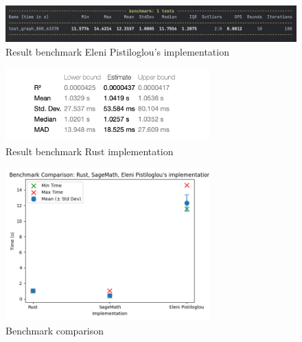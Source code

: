 \begin{figure}[!h]
    \centering
    \includegraphics[width=1\textwidth]{images/benchmark/graph_800_63378/benchmark_graph_800_63378_python}
    \caption{Result benchmark Eleni Pistiloglou's implementation}
    \label{fig:benchmark-graph-800-63378-python}
\end{figure}

\begin{figure}[!h]
    \centering
    \includegraphics[width=0.70\textwidth]{images/benchmark/graph_800_63378/benchmark_graph_800_63378_rust}
    \caption{Result benchmark Rust implementation}
    \label{fig:benchmark-graph-800-63378-rust}
\end{figure}

\begin{figure}[!h]
    \centering
    \includegraphics[width=0.70\textwidth]{images/benchmark/graph_800_63378/benchmark_comparison_graph_800_63378}
    \caption{Benchmark comparison}
    \label{fig:benchmark-comparison-graph-800-63378}
\end{figure}

